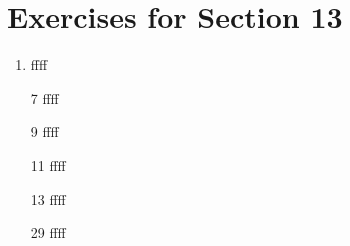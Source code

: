 \documentclass[12pt]{article}
\begin{document}
\section*{Exercises for Section 13}
\begin{enumerate}
	\item ffff
	\item [7] ffff
	\item [9] ffff
	\item [11] ffff
	\item [13] ffff
	\item [29] ffff
\end{enumerate}
\end{document}
